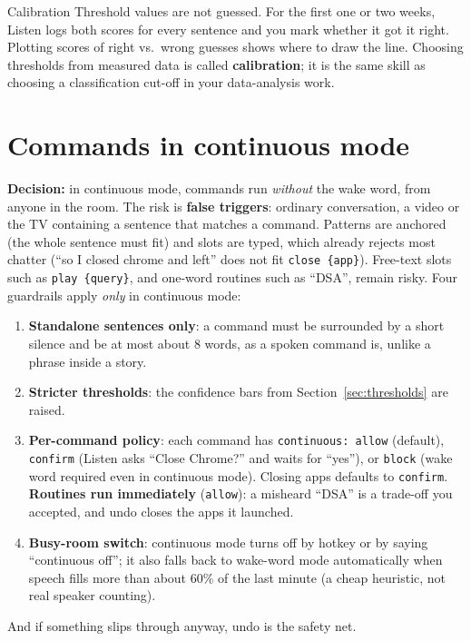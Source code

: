 \documentclass[11pt,a4paper]{article}
\begin{document}
\begin{concept}{Calibration}
Threshold values are not guessed. For the first one or two weeks, Listen logs both scores for
every sentence and you mark whether it got it right. Plotting scores of right vs.\ wrong
guesses shows where to draw the line. Choosing thresholds from measured data is called
\textbf{calibration}; it is the same skill as choosing a classification cut-off in your
data-analysis work.
\end{concept}

\section{Commands in continuous mode}\label{sec:continuous}

\textbf{Decision:} in continuous mode, commands run \emph{without} the wake word, from anyone
in the room. The risk is \textbf{false triggers}: ordinary conversation, a video or the TV
containing a sentence that matches a command. Patterns are anchored (the whole sentence must
fit) and slots are typed, which already rejects most chatter (``so I closed chrome and left''
does not fit \texttt{close \{app\}}). Free-text slots such as \texttt{play \{query\}}, and
one-word routines such as ``DSA'', remain risky. Four guardrails apply \emph{only} in
continuous mode:

\begin{enumerate}[nosep]
  \item \textbf{Standalone sentences only}: a command must be surrounded by a short silence
        and be at most about 8 words, as a spoken command is, unlike a phrase inside a story.
  \item \textbf{Stricter thresholds}: the confidence bars from
        Section~\ref{sec:thresholds} are raised.
  \item \textbf{Per-command policy}: each command has \texttt{continuous: allow}
        (default), \texttt{confirm} (Listen asks ``Close Chrome?'' and waits for ``yes''), or
        \texttt{block} (wake word required even in continuous mode). Closing apps defaults
        to \texttt{confirm}. \textbf{Routines run immediately} (\texttt{allow}): a misheard
        ``DSA'' is a trade-off you accepted, and undo closes the apps it launched.
  \item \textbf{Busy-room switch}: continuous mode turns off by hotkey or by saying
        ``continuous off''; it also falls back to wake-word mode automatically when speech
        fills more than about 60\% of the last minute (a cheap heuristic, not real speaker
        counting).
\end{enumerate}
\noindent And if something slips through anyway, undo is the safety net.
\end{document}
